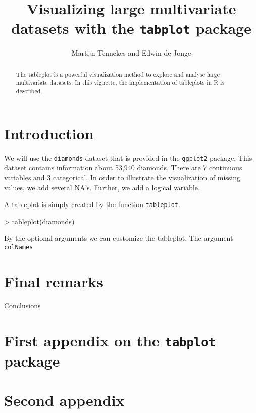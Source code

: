 \documentclass[11pt, fleqn, a4paper]{article}
\title{Visualizing large multivariate datasets with the {\tt tabplot} package}
\author{Martijn Tennekes and Edwin de Jonge}
\begin{document}
\maketitle
\begin{abstract}

The tableplot is a powerful visualization method to explore and analyse large multivariate datasets. In this vignette, the implementation of tableplots in R is described. 


\end{abstract}

\maketitle

\newpage

\tableofcontents
\listofalgorithms
\newpage
\section{Introduction}
We will use the {\tt diamonds} dataset that is provided in the {\tt ggplot2} package. This dataset contains information about 53,940 diamonds. There are 7 continuous variables and 3 categorical. In order to illustrate the visualization of missing values, we add several NA's. Further, we add a logical variable.

\begin{Schunk}
\end{Schunk}

A tableplot is simply created by the function {\tt tableplot}.
\begin{Schunk}
\begin{Sinput}
> tableplot(diamonds)
\end{Sinput}
\end{Schunk}

By the optional arguments we can customize the tableplot. The argument {\tt colNames} 


\section{Final remarks}
Conclusions


%
%

\newpage
\appendix
\section{First appendix on the {\tt tabplot} package}
\section{Second appendix}
\end{document}
